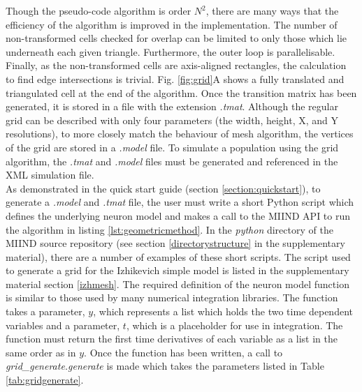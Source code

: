 \documentclass[utf8]{frontiersSCNS} %
\begin{document}
Though the pseudo-code algorithm is order $N^2$, there are many ways that the efficiency of the algorithm is improved in the implementation. The number of non-transformed cells checked for overlap can be limited to only those which lie underneath each given triangle. Furthermore, the outer loop is parallelisable. Finally, as the non-transformed cells are axis-aligned rectangles, the calculation to find edge intersections is trivial. Fig. \ref{fig:grid}A shows a fully translated and triangulated cell at the end of the algorithm. Once the transition matrix has been generated, it is stored in a file with the extension \textit{.tmat}. Although the regular grid can be described with only four parameters (the width, height, X, and Y resolutions), to more closely match the behaviour of mesh algorithm, the vertices of the grid are stored in a \textit{.model} file. To simulate a population using the grid algorithm, the \textit{.tmat} and \textit{.model} files must be generated and referenced in the XML simulation file.\\

As demonstrated in the quick start guide (section \ref{section:quickstart}), to generate a \textit{.model} and \textit{.tmat} file, the user must write a short Python script which defines the underlying neuron model and makes a call to the MIIND API to run the algorithm in listing \ref{lst:geometricmethod}. In the \textit{python} directory of the MIIND source repository (see section \ref{directorystructure} in the supplementary material), there are a number of examples of these short scripts. The script used to generate a grid for the Izhikevich simple model is listed in the supplementary material section \ref{izhmesh}. The required definition of the neuron model function is similar to those used by many numerical integration libraries. The function takes a parameter, $y$, which represents a list which holds the two time dependent variables and a parameter, $t$, which is a placeholder for use in integration. The function must return the first time derivatives of each variable as a list in the same order as in $y$. Once the function has been written, a call to \textit{grid\_generate.generate} is made which takes the parameters listed in Table \ref{tab:gridgenerate}. 
\end{document}
